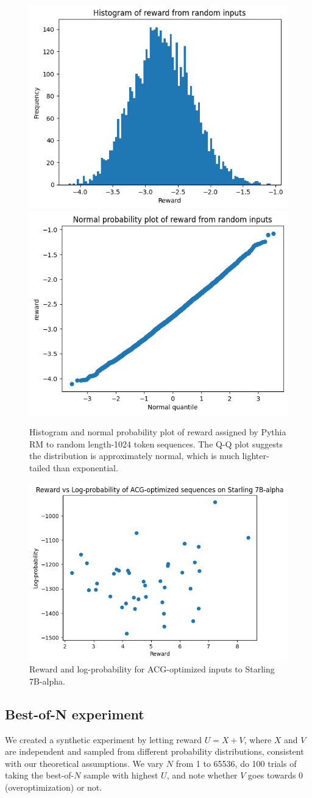 \documentclass{article}
\begin{document}
\begin{figure}
    \centering
    \includegraphics[width=0.4\linewidth]{reward_hist_random_pythia.png}
    \includegraphics[width=0.4\linewidth]{reward_qq_random_pythia.png}
    \caption{Histogram and normal probability plot of reward assigned by Pythia RM to random length-1024 token sequences. The Q-Q plot suggests the distribution is approximately normal, which is much lighter-tailed than exponential.}
    \label{fig:pythia-random}
\end{figure}

\begin{figure}
    \centering
    \includegraphics[width=0.5\linewidth]{images/acg_results_40.png}
    \caption{Reward and log-probability for ACG-optimized inputs to Starling 7B-alpha.}
    \label{fig:acg-results}
\end{figure}

\subsection{Best-of-N experiment}

We created a synthetic experiment by letting reward $U = X + V$, where $X$ and $V$ are independent and sampled from different probability distributions, consistent with our theoretical assumptions. We vary $N$ from 1 to 65536, do 100 trials of taking the best-of-$N$ sample with highest $U$, and note whether $V$ goes towards 0 (overoptimization) or not.
\end{document}
